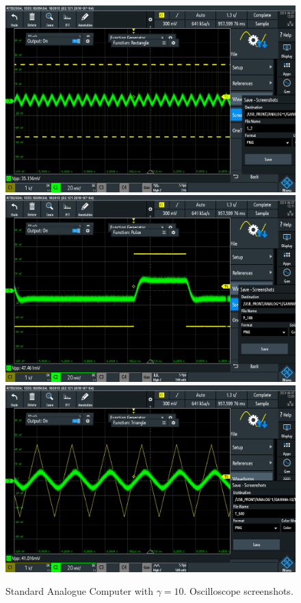 \documentclass[journal]{Imperial_lab_report}
\begin{document}
\begin{appendices}
\begin{figure}[ht]
            \includegraphics[scale = 0.10]{G10_S_2000_pic.PNG}
            \includegraphics[scale = 0.10]{G10_P_100_pic.PNG}
            \includegraphics[scale = 0.10]{G10_T_500_pic.PNG}
            \caption{Standard Analogue Computer with $\gamma = 10$. Oscilloscope screenshots.}
        \end{figure}
        \clearpage
        \newpage

\end{appendices}
\end{document}
